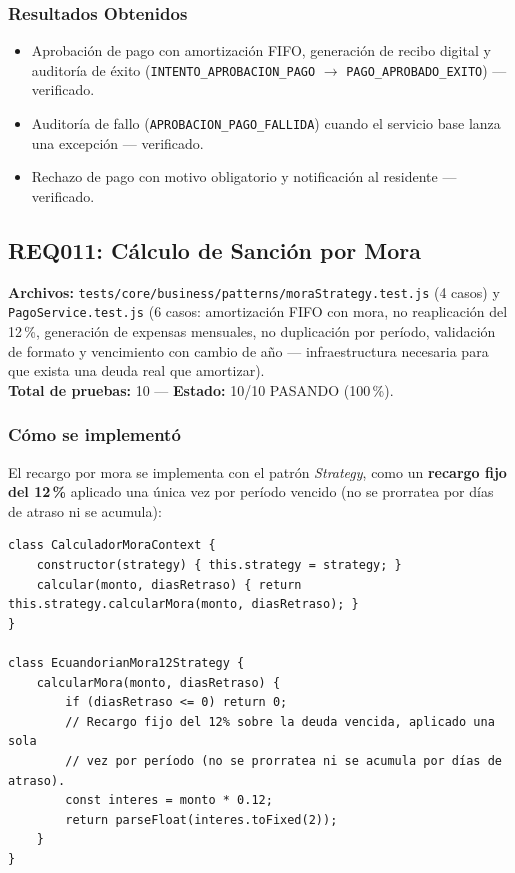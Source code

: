 \documentclass[12pt,a4paper]{article}
\begin{document}
\subsubsection*{Resultados Obtenidos}
\begin{itemize}[nosep]
    \item Aprobación de pago con amortización FIFO, generación de recibo digital y
    auditoría de éxito (\texttt{INTENTO\_APROBACION\_PAGO} $\rightarrow$
    \texttt{PAGO\_APROBADO\_EXITO}) — verificado.
    \item Auditoría de fallo (\texttt{APROBACION\_PAGO\_FALLIDA}) cuando el servicio base
    lanza una excepción — verificado.
    \item Rechazo de pago con motivo obligatorio y notificación al residente — verificado.
\end{itemize}

\subsection{REQ011: Cálculo de Sanción por Mora}
\textbf{Archivos:} \texttt{tests/core/business/patterns/moraStrategy.test.js} (4 casos) y
\texttt{PagoService.test.js} (6 casos: amortización FIFO con mora, no reaplicación del 12\,\%,
generación de expensas mensuales, no duplicación por período, validación de formato y
vencimiento con cambio de año — infraestructura necesaria para que exista una deuda real
que amortizar).\\
\textbf{Total de pruebas:} 10 — \textbf{Estado:} 10/10 PASANDO (100\,\%).

\subsubsection*{Cómo se implementó}

El recargo por mora se implementa con el patrón \emph{Strategy}, como un
\textbf{recargo fijo del 12\,\%} aplicado una única vez por período vencido (no se
prorratea por días de atraso ni se acumula):

\begin{lstlisting}[caption={\texttt{EcuandorianMora12Strategy} (\texttt{src/core/business/patterns/moraStrategy.js})}]
class CalculadorMoraContext {
    constructor(strategy) { this.strategy = strategy; }
    calcular(monto, diasRetraso) { return this.strategy.calcularMora(monto, diasRetraso); }
}

class EcuandorianMora12Strategy {
    calcularMora(monto, diasRetraso) {
        if (diasRetraso <= 0) return 0;
        // Recargo fijo del 12% sobre la deuda vencida, aplicado una sola
        // vez por período (no se prorratea ni se acumula por días de atraso).
        const interes = monto * 0.12;
        return parseFloat(interes.toFixed(2));
    }
}
\end{lstlisting}
\end{document}
